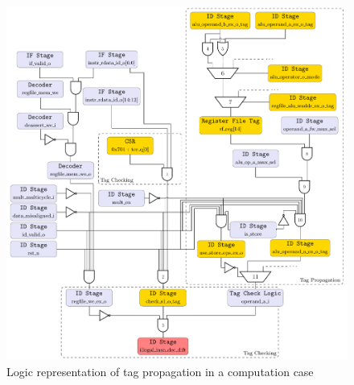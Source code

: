 \begin{figure}[ht]
    \centering
    \includegraphics[width=\textwidth]{c3_vulnerabilities_assessment/img/comp_compu/arborescence_propagation.pdf}
    \caption{Logic representation of tag propagation in a computation case}
    \label{fig:attack_propag_v3_tag_propagation}
\end{figure}

